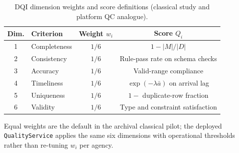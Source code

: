 \begin{table}[H]
  \centering
  \caption{DQI dimension weights and score definitions (classical study and platform QC analogue).}
  \label{tab:dqi_weights}
  \small
  \begin{tabular}{@{}clcc@{}}
    \toprule
    \textbf{Dim.} & \textbf{Criterion} & \textbf{Weight $w_i$} & \textbf{Score $Q_i$} \\
    \midrule
    1 & Completeness & $1/6$ & $1 - |M|/|D|$ \\
    2 & Consistency & $1/6$ & Rule-pass rate on schema checks \\
    3 & Accuracy & $1/6$ & Valid-range compliance \\
    4 & Timeliness & $1/6$ & $\exp(-\lambda \bar{a})$ on arrival lag \\
    5 & Uniqueness & $1/6$ & $1 -$ duplicate-row fraction \\
    6 & Validity & $1/6$ & Type and constraint satisfaction \\
    \bottomrule
  \end{tabular}
  \vspace{0.5em}

  \raggedright\footnotesize Equal weights are the default in the archival classical pilot; the deployed \texttt{QualityService} applies the same six dimensions with operational thresholds rather than re-tuning $w_i$ per agency.
\end{table}
